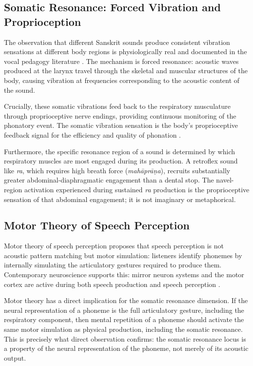 \documentclass[12pt]{article}
\begin{document}
\subsection{Somatic Resonance: Forced Vibration and Proprioception}

The observation that different Sanskrit sounds produce consistent vibration sensations at different body regions is physiologically real and documented in the vocal pedagogy literature \citep{sundberg1987, titze1994}. The mechanism is forced resonance: acoustic waves produced at the larynx travel through the skeletal and muscular structures of the body, causing vibration at frequencies corresponding to the acoustic content of the sound.

Crucially, these somatic vibrations feed back to the respiratory musculature through proprioceptive nerve endings, providing continuous monitoring of the phonatory event. The somatic vibration sensation is the body's proprioceptive feedback signal for the efficiency and quality of phonation \citep{titze1994}.

Furthermore, the specific resonance region of a sound is determined by which respiratory muscles are most engaged during its production. A retroflex sound like \textit{ra}, which requires high breath force (\textit{mah\={a}pr\={a}\d{n}a}), recruits substantially greater abdominal-diaphragmatic engagement than a dental stop. The navel-region activation experienced during sustained \textit{ra} production is the proprioceptive sensation of that abdominal engagement; it is not imaginary or metaphorical.

\subsection{Motor Theory of Speech Perception}

Motor theory of speech perception \citep{liberman1967, liberman1985} proposes that speech perception is not acoustic pattern matching but motor simulation: listeners identify phonemes by internally simulating the articulatory gestures required to produce them. Contemporary neuroscience supports this: mirror neuron systems and the motor cortex are active during both speech production and speech perception \citep{wilson2004, pulvermuller2006}.

Motor theory has a direct implication for the somatic resonance dimension. If the neural representation of a phoneme is the full articulatory gesture, including the respiratory component, then mental repetition of a phoneme should activate the same motor simulation as physical production, including the somatic resonance. This is precisely what direct observation confirms: the somatic resonance locus is a property of the neural representation of the phoneme, not merely of its acoustic output.
\end{document}
